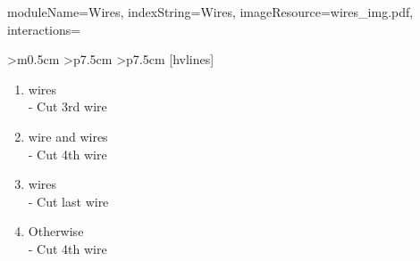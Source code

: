 \documentclass{../../ktane-mod}
\begin{document}
\begin{module}{
  moduleName=Wires,
  indexString=Wires,
  imageResource=wires_img.pdf,
  interactions=\keysymbol
}
\begin{NiceTabular}{
    >{\centering\arraybackslash}m{0.5cm}
    >{\centering\arraybackslash}p{7.5cm}
    >{\centering\arraybackslash}p{7.5cm}
  }[hvlines]
\begin{minipage}[c][4cm][t]{\linewidth}
\begin{enumerate}[label=\alph*.,itemsep=0pt]
                         \item \YELLOW[No YELLOW] wires\\ - Cut 3rd wire
                         \item \YELLOW[1 YELLOW] wire and \WHITE[2+ WHITE] wires\\ - Cut 4th wire
                         \item \RED[No RED] wires\\ - Cut last wire
                         \item Otherwise\\ - Cut 4th wire
                       \end{enumerate}
    \end{minipage} \\
  \end{NiceTabular}
  \renewcommand{\arraystretch}{1.0}
\end{module}
\end{document}
